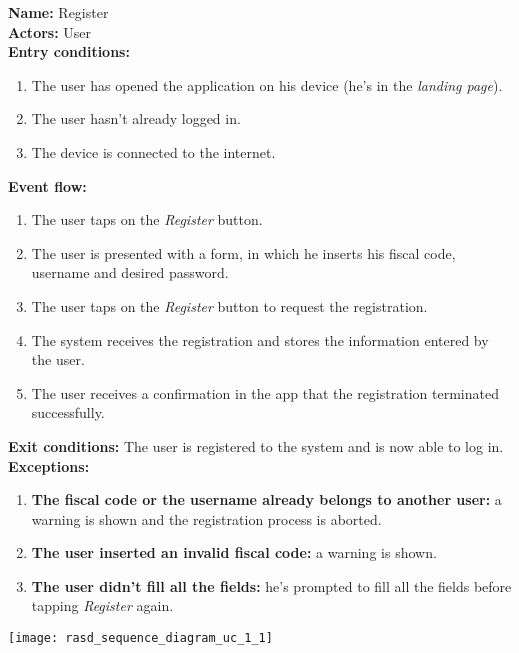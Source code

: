 \begin{usecase}{1.1}
\label{uc:1.1}
\textbf{Name:} Register\\
\textbf{Actors:} User\\
\textbf{Entry conditions:}
\begin{enumerate}
    \item The user has opened the application on his device
    (he's in the \emph{landing page}).
    \item The user hasn't already logged in.
    \item The device is connected to the internet.
\end{enumerate}
\textbf{Event flow:}
\begin{enumerate}
    \item The user taps on the \emph{Register} button.
    \item The user is presented with a form, in which he inserts his
    fiscal code, username and desired password.
    \item The user taps on the \emph{Register} button to request the
    registration.
    \item The system receives the registration and stores the information
    entered by the user.
    \item The user receives a confirmation in the app that the registration
    terminated successfully.
\end{enumerate}
\textbf{Exit conditions:} The user is registered to the system and is now able
to log in.\\
\textbf{Exceptions:}
\begin{enumerate}
    \item\textbf{The fiscal code or the username already belongs to another user:}
    a warning is shown and the registration process is aborted.
    \item\textbf{The user inserted an invalid fiscal code:} a warning is shown.
    \item\textbf{The user didn't fill all the fields:} he's prompted to
    fill all the fields before tapping \emph{Register} again.
\end{enumerate}
\tcblower
\centering
\texttt{[image: rasd\_sequence\_diagram\_uc\_1\_1]}
\end{usecase}